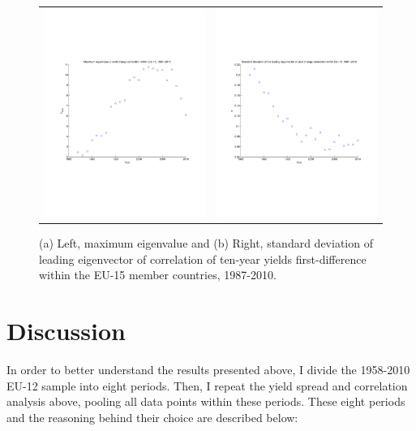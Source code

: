 \documentclass[3p]{elsarticle}
\begin{document}
\begin{figure}[ht!]
	\centering
	\begin{tabular}{cc}
		\includegraphics[width=7cm]{fig_diff_maxeig_eu15} & \includegraphics[width=7cm]{fig_diff_maxeigstd_eu15}
	\end{tabular}
	\caption{(a) Left, maximum eigenvalue and (b) Right, standard deviation of leading eigenvector of correlation of ten-year yields first-difference within the EU-15 member countries, 1987-2010.}
	\label{fig:diff_maxeig_eu15}
\end{figure}

\section{Discussion}
\label{sec:discussion}
In order to better understand the results presented above, I divide the 1958-2010 EU-12 sample into eight periods.  Then, I repeat the yield spread and correlation analysis above, pooling all data points within these periods.  These eight periods and the reasoning behind their choice are described below:
\end{document}
